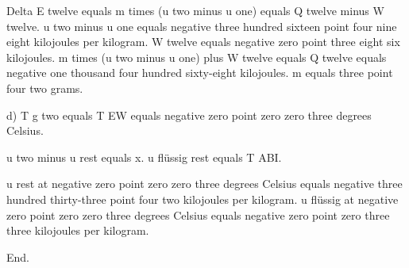 Delta E twelve equals m times (u two minus u one) equals Q twelve minus W twelve.  
u two minus u one equals negative three hundred sixteen point four nine eight kilojoules per kilogram.  
W twelve equals negative zero point three eight six kilojoules.  
m times (u two minus u one) plus W twelve equals Q twelve equals negative one thousand four hundred sixty-eight kilojoules.  
m equals three point four two grams.  

d)  
T g two equals T EW equals negative zero point zero zero three degrees Celsius.  

u two minus u rest equals x.  
u flüssig rest equals T ABI.  

u rest at negative zero point zero zero three degrees Celsius equals negative three hundred thirty-three point four two kilojoules per kilogram.  
u flüssig at negative zero point zero zero three degrees Celsius equals negative zero point zero three three kilojoules per kilogram.  

End.